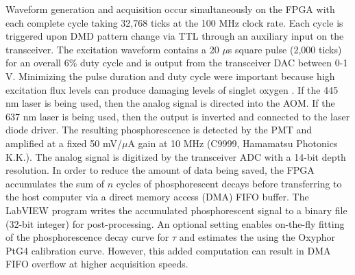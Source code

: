 Waveform generation and acquisition occur simultaneously on the FPGA with each complete cycle taking 32,768 ticks at the 100 MHz clock rate. Each cycle is triggered upon DMD pattern change via TTL through an auxiliary input on the transceiver. The excitation waveform contains a 20 $\mu$s square pulse (2,000 ticks) for an overall 6\% duty cycle and is output from the transceiver DAC between 0-1 V. Minimizing the pulse duration and duty cycle were important because high excitation flux levels can produce damaging levels of singlet oxygen \cite{Wilson:2005te}. If the 445 nm laser is being used, then the analog signal is directed into the AOM. If the 637 nm laser is being used, then the output is inverted and connected to the laser diode driver. The resulting phosphorescence is detected by the PMT and amplified at a fixed 50 mV/$\mu$A gain at 10 MHz (C9999, Hamamatsu Photonics K.K.). The analog signal is digitized by the transceiver ADC with a 14-bit depth resolution. In order to reduce the amount of data being saved, the FPGA accumulates the sum of $n$ cycles of phosphorescent decays before transferring to the host computer via a direct memory access (DMA) FIFO buffer. The LabVIEW program writes the accumulated phosphorescent signal to a binary file (32-bit integer) for post-processing. An optional setting enables on-the-fly fitting of the phosphorescence decay curve for $\tau$ and estimates the  using the Oxyphor PtG4 calibration curve. However, this added computation can result in DMA FIFO overflow at higher acquisition speeds.

\begin{table}
    \caption[Common phosphorescence lifetime acquisition settings]{
        Common acquisition settings for the phosphorescence lifetime measurements ($n$ = number of DMD patterns). Raw data is acquired by the FPGA at a rate of 160 MB/s.
    }
    \label{tab:lifetime_settings}
    \centering
\end{table}

